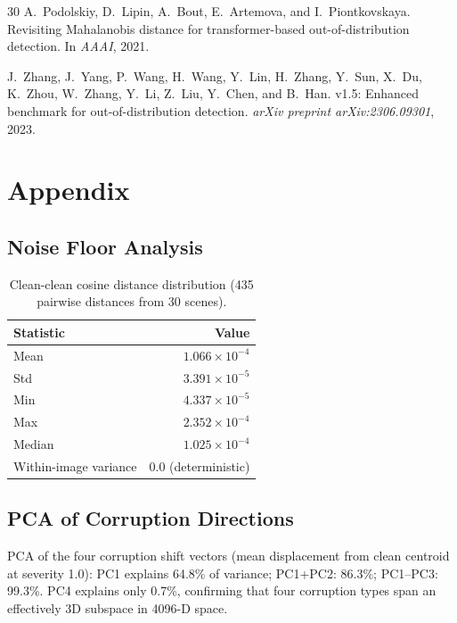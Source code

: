 \documentclass[11pt]{article}
\begin{document}
\begin{thebibliography}{30}
A.~Podolskiy, D.~Lipin, A.~Bout, E.~Artemova, and I.~Piontkovskaya.
\newblock Revisiting {M}ahalanobis distance for transformer-based out-of-distribution detection.
\newblock In \emph{AAAI}, 2021.

J.~Zhang, J.~Yang, P.~Wang, H.~Wang, Y.~Lin, H.~Zhang, Y.~Sun, X.~Du, K.~Zhou, W.~Zhang, Y.~Li, Z.~Liu, Y.~Chen, and B.~Han.
 v1.5: Enhanced benchmark for out-of-distribution detection.
\newblock \emph{arXiv preprint arXiv:2306.09301}, 2023.

\end{thebibliography}

\appendix
\section{Appendix}

\subsection{Noise Floor Analysis}
\label{app:noise_floor}

\begin{table}[h]
\centering
\caption{Clean-clean cosine distance distribution (435 pairwise distances from 30 scenes).}
\label{tab:noise_floor}
\small
\begin{tabular}{lr}
\toprule
\textbf{Statistic} & \textbf{Value} \\
\midrule
Mean & $1.066 \times 10^{-4}$ \\
Std & $3.391 \times 10^{-5}$ \\
Min & $4.337 \times 10^{-5}$ \\
Max & $2.352 \times 10^{-4}$ \\
Median & $1.025 \times 10^{-4}$ \\
Within-image variance & 0.0 (deterministic) \\
\bottomrule
\end{tabular}
\end{table}

\subsection{PCA of Corruption Directions}
\label{app:pca}

PCA of the four corruption shift vectors (mean displacement from clean centroid at severity 1.0):
PC1 explains 64.8\% of variance; PC1+PC2: 86.3\%; PC1--PC3: 99.3\%.
PC4 explains only 0.7\%, confirming that four corruption types span an effectively 3D subspace in 4096-D space.
\end{document}
